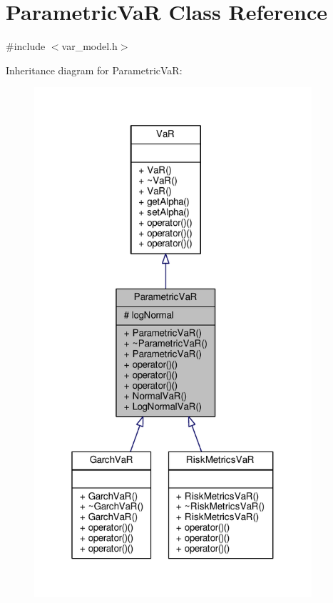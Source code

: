 \hypertarget{classParametricVaR}{}\section{Parametric\+VaR Class Reference}
\label{classParametricVaR}


{\ttfamily \#include $<$var\+\_\+model.\+h$>$}



Inheritance diagram for Parametric\+VaR\+:
\nopagebreak
\begin{figure}[H]
\begin{center}
\leavevmode
\includegraphics[width=292pt]{classParametricVaR__inherit__graph}
\end{center}
\end{figure}


